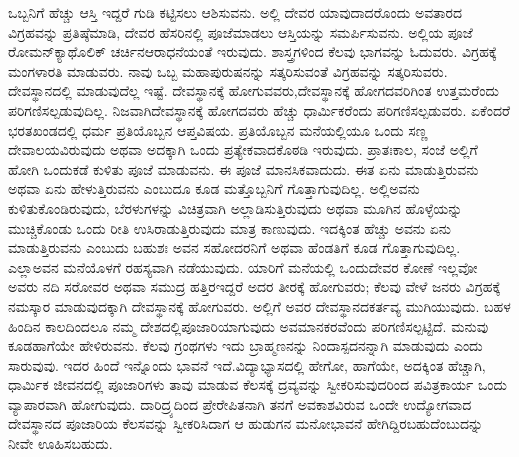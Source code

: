 ಒಬ್ಬನಿಗೆ ಹೆಚ್ಚು ಆಸ್ತಿ ಇದ್ದರೆ ಗುಡಿ ಕಟ್ಟಿಸಲು ಆಶಿಸುವನು. ಅಲ್ಲಿ ದೇವರ ಯಾವುದಾದರೊಂದು ಅವತಾರದ ವಿಗ್ರಹವನ್ನು ಪ್ರತಿಷ್ಠೆಮಾಡಿ, ದೇವರ ಹೆಸರಿನಲ್ಲಿ ಪೂಜೆಮಾಡಲು ಆಸ್ತಿಯನ್ನು ಸಮರ್ಪಿಸುವನು. ಅಲ್ಲಿಯ ಪೂಜೆ ರೋಮನ್​ಕ್ಯಾಥೊಲಿಕ್​ ಚರ್ಚಿನ\break ಆರಾಧನೆಯಂತೆ ಇರುವುದು. ಶಾಸ್ತ್ರಗಳಿಂದ ಕೆಲವು ಭಾಗವನ್ನು ಓದುವರು. ವಿಗ್ರಹಕ್ಕೆ ಮಂಗಳಾರತಿ ಮಾಡುವರು. ನಾವು ಒಬ್ಬ ಮಹಾಪುರುಷನನ್ನು ಸತ್ಕರಿಸುವಂತೆ ವಿಗ್ರಹವನ್ನು ಸತ್ಕರಿಸುವರು. ದೇವಸ್ಥಾನದಲ್ಲಿ ಮಾಡುವುದೆಲ್ಲ ಇಷ್ಟೆ. ದೇವಸ್ಥಾನಕ್ಕೆ ಹೋಗುವವರು,\break ದೇವಸ್ಥಾನಕ್ಕೆ ಹೋಗದವರಿಗಿಂತ ಉತ್ತಮರೆಂದು ಪರಿಗಣಿಸಲ್ಪಡುವುದಿಲ್ಲ. ನಿಜವಾಗಿ\break ದೇವಸ್ಥಾನಕ್ಕೆ ಹೋಗದವರು ಹೆಚ್ಚು ಧಾರ್ಮಿಕರೆಂದು ಪರಿಗಣಿಸಲ್ಪಡುವರು. ಏಕೆಂದರೆ ಭರತಖಂಡದಲ್ಲಿ ಧರ್ಮ ಪ್ರತಿಯೊಬ್ಬನ ಆಪ್ತವಿಷಯ. ಪ್ರತಿಯೊಬ್ಬನ ಮನೆಯಲ್ಲಿಯೂ ಒಂದು ಸಣ್ಣ ದೇವಾಲಯವಿರುವುದು ಅಥವಾ ಅದಕ್ಕಾಗಿ ಒಂದು ಪ್ರತ್ಯೇಕವಾದ\break ಕೊಠಡಿ ಇರುವುದು. ಪ್ರಾತಃಕಾಲ, ಸಂಜೆ ಅಲ್ಲಿಗೆ ಹೋಗಿ ಒಂದುಕಡೆ ಕುಳಿತು ಪೂಜೆ ಮಾಡುವನು. ಈ ಪೂಜೆ ಮಾನಸಿಕವಾದುದು. ಈತ ಏನು ಮಾಡುತ್ತಿರುವನು ಅಥವಾ ಏನು ಹೇಳುತ್ತಿರುವನು ಎಂಬುದೂ ಕೂಡ ಮತ್ತೊಬ್ಬನಿಗೆ ಗೊತ್ತಾಗುವುದಿಲ್ಲ. ಅಲ್ಲಿ\break ಅವನು ಕುಳಿತುಕೊಂಡಿರುವುದು, ಬೆರಳುಗಳನ್ನು ವಿಚಿತ್ರವಾಗಿ ಅಲ್ಲಾಡಿಸುತ್ತಿರುವುದು ಅಥವಾ ಮೂಗಿನ ಹೊಳ್ಳೆಯನ್ನು ಮುಚ್ಚಿಕೊಂಡು ಒಂದು ರೀತಿ ಉಸಿರಾಡುತ್ತಿರುವುದು ಮಾತ್ರ ಕಾಣುವುದು. ಇದಕ್ಕಿಂತ ಹೆಚ್ಚು ಅವನು ಏನು ಮಾಡುತ್ತಿರುವನು ಎಂಬುದು ಬಹುಶಃ ಅವನ ಸಹೋದರನಿಗೆ ಅಥವಾ ಹೆಂಡತಿಗೆ ಕೂಡ ಗೊತ್ತಾಗುವುದಿಲ್ಲ. ಎಲ್ಲಾ\break ಅವನ ಮನೆಯೊಳಗೆ ರಹಸ್ಯವಾಗಿ ನಡೆಯುವುದು. ಯಾರಿಗೆ ಮನೆಯಲ್ಲಿ ಒಂದು\break ದೇವರ ಕೋಣೆ ಇಲ್ಲವೋ ಅವರು ನದಿ ಸರೋವರ ಅಥವಾ ಸಮುದ್ರ ಹತ್ತಿರ\break ಇದ್ದರೆ ಅದರ ತೀರಕ್ಕೆ ಹೋಗುವರು; ಕೆಲವು ವೇಳೆ ಜನರು ವಿಗ್ರಹಕ್ಕೆ ನಮಸ್ಕಾರ ಮಾಡುವುದಕ್ಕಾಗಿ ದೇವಸ್ಥಾನಕ್ಕೆ ಹೋಗುವರು. ಅಲ್ಲಿಗೆ ಅವರ ದೇವಸ್ಥಾನದ\break ಕರ್ತವ್ಯ ಮುಗಿಯುವುದು. ಬಹಳ ಹಿಂದಿನ ಕಾಲದಿಂದಲೂ ನಮ್ಮ ದೇಶದಲ್ಲಿ\break ಪೂಜಾರಿಯಾಗುವುದು ಅವಮಾನಕರವೆಂದು ಪರಿಗಣಿಸಲ್ಪಟ್ಟಿದೆ. ಮನುವು ಕೂಡ\break ಹಾಗೆಯೇ ಹೇಳಿರುವನು. ಕೆಲವು ಗ್ರಂಥಗಳು ಇದು ಬ್ರಾಹ್ಮಣನನ್ನು ನಿಂದಾಸ್ಪದನನ್ನಾಗಿ ಮಾಡುವುದು ಎಂದು ಸಾರುವುವು. ಇದರ ಹಿಂದೆ ಇನ್ನೊಂದು ಭಾವನೆ ಇದೆ.\break ವಿದ್ಯಾಭ್ಯಾಸದಲ್ಲಿ ಹೇಗೋ, ಹಾಗೆಯೇ, ಅದಕ್ಕಿಂತ ಹೆಚ್ಚಾಗಿ, ಧಾರ್ಮಿಕ ಜೀವನದಲ್ಲಿ ಪೂಜಾರಿಗಳು ತಾವು ಮಾಡುವ ಕೆಲಸಕ್ಕೆ ದ್ರವ್ಯವನ್ನು ಸ್ವೀಕರಿಸುವುದರಿಂದ ಪವಿತ್ರ\break ಕಾರ್ಯ ಒಂದು ವ್ಯಾಪಾರವಾಗಿ ಹೋಗುವುದು. ದಾರಿದ್ರ್ಯದಿಂದ ಪ್ರೇರೇಪಿತನಾಗಿ ತನಗೆ ಅವಕಾಶವಿರುವ ಒಂದೇ ಉದ್ಯೋಗವಾದ ದೇವಸ್ಥಾನದ ಪೂಜಾರಿಯ ಕೆಲಸವನ್ನು ಸ್ವೀಕರಿಸಿದಾಗ ಆ ಹುಡುಗನ ಮನೋಭಾವನೆ ಹೇಗಿದ್ದಿರಬಹುದೆಂಬುದನ್ನು ನೀವೇ ಊಹಿಸಬಹುದು.

